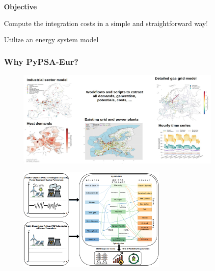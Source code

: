 \documentclass[aspectratio=169]{beamer}
\begin{document}
\begin{frame}
  \centering
  \Large \textbf{Objective} \par
  \vspace{0.5em}
  \Large Compute the integration costs in a simple and straightforward way! \par
  \vspace{1em}
  \Large {Utilize an energy system model}
\end{frame}

\begin{frame}[fragile]
  \frametitle{Why PyPSA-Eur?}
  \begin{figure}
    \centering
    \includegraphics[width=0.9\textwidth]{s12s186.jpg}
  \end{figure}
\end{frame}

\begin{frame}{\insertsectionhead}

\begin{figure}
    \centering
    \includegraphics[width=0.65\textwidth]{method.png}
  \end{figure}
\end{frame}
\end{document}
